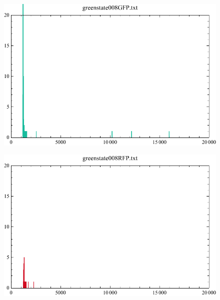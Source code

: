 \documentclass[english,11pt,a4paper]{article}
\begin{document}
\begin{figure}[h]
\centering
	\begin{minipage}{.5\textwidth}
  		\centering
  		\includegraphics[width=.9\linewidth]{greenstate008GFP.pdf}
  		\label{fig:onc1GFPGreenState}
	\end{minipage}%
	\begin{minipage}{.5\textwidth}
  		\centering
  		\includegraphics[width=.9\linewidth]{greenstate008RFP.pdf}
  		\label{fig:onc1RFPGreenState}  
	\end{minipage}
\end{figure}
\end{document}
